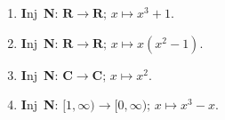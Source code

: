 \documentclass[12pt, reqno]{amsart}
\begin{document}
\begin{enumerate}
\begin{enumerate}
  \item \textbf{I}nj\,  \textbf{N}:
    \hspace{12pt}
$\mathbf{R} \to \mathbf{R};\, x \mapsto x^3+1$.
\vspace{22pt}

  \item \textbf{I}nj\,  \textbf{N}:
    \hspace{12pt}
$\mathbf{R} \to \mathbf{R};\, x \mapsto x(x^2-1)$.
\vspace{22pt}

  \item \textbf{I}nj\,  \textbf{N}:
    \hspace{12pt}
$\mathbf{C} \to \mathbf{C};\, x \mapsto x^2$.
\vspace{22pt}

  \item \textbf{I}nj\, \textbf{N}:
    \hspace{12pt}
$[1,\infty) \to [0,\infty);\, x \mapsto x^3 - x$.
\vspace{22pt}

  \end{enumerate}

\end{enumerate}
\end{document}
